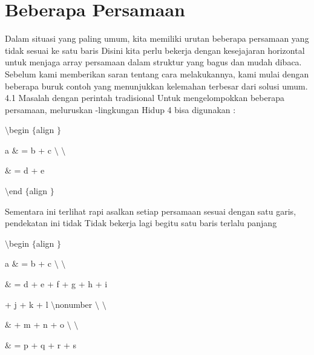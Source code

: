 \section{Beberapa Persamaan} 
\noindent 
 \hspace*{0.5in} Dalam situasi yang paling umum, kita memiliki urutan beberapa persamaan yang tidak sesuai ke satu baris Disini kita perlu bekerja dengan kesejajaran horizontal untuk menjaga array persamaan dalam struktur yang bagus dan mudah dibaca. Sebelum kami memberikan saran tentang cara melakukannya, kami mulai dengan beberapa buruk contoh yang menunjukkan kelemahan terbesar dari solusi umum. 4.1 Masalah dengan perintah tradisional Untuk mengelompokkan beberapa persamaan, meluruskan -lingkungan Hidup 4 bisa digunakan : \par
\vspace{12pt}
\noindent 
 $  \setminus  $begin $  \{  $align $  \}  $ \par
\vspace{12pt}
\noindent 
a  $  \&  $ = b + c  $  \setminus  $ $  \setminus  $ \par
\vspace{12pt}
\noindent 
 $  \&  $ = d + e \par
\vspace{12pt}
\noindent 
 $  \setminus  $end $  \{  $align $  \}  $ \par
\vspace{12pt}
\noindent 
Sementara ini terlihat rapi asalkan setiap persamaan sesuai dengan satu garis, pendekatan ini tidak Tidak bekerja lagi begitu satu baris terlalu panjang \par
\noindent 
 $  \setminus  $begin $  \{  $align $  \}  $ \par
\vspace{12pt}
\noindent 
a  $  \&  $ = b + c  $  \setminus  $ $  \setminus  $ \par
\vspace{12pt}
\noindent 
 $  \&  $ = d + e + f + g + h + i \par
\noindent 
  \par
\noindent 
+ j + k + l  $  \setminus  $nonumber $  \setminus  $ $  \setminus  $ \par
\vspace{12pt}
\noindent 
 $  \&  $ + m + n + o  $  \setminus  $ $  \setminus  $ \par
\vspace{12pt}
\noindent 
 $  \&  $ = p + q + r + s \par
\vspace{12pt}
